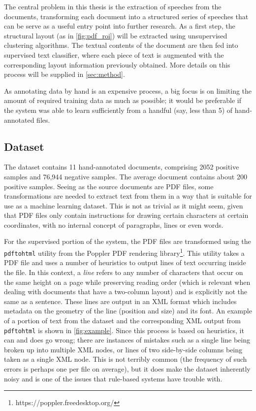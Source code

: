 The central problem in this thesis is the extraction of speeches from the
documents, transforming each document into a structured series of speeches that
can be serve as a useful entry point into further research. As a first step, the
structural layout (as in \cref{fig:pdf_roi}) will be extracted using
unsupervised clustering algorithms. The textual contents of the document are
then fed into supervised text classifier, where each piece of text is augmented
with the corresponding layout information previously obtained. More details on
this process will be supplied in \cref{sec:method}.

As annotating data by hand is an expensive process, a big focus is on limiting
the amount of required training data as much as possible; it would be preferable
if the system was able to learn sufficiently from a handful (say, less than 5)
of hand-annotated files.

\subsection{Dataset}
The dataset contains 11 hand-annotated documents, comprising 2052 positive
samples and 76,944 negative samples. The average document contains about 200
positive samples. Seeing as the source documents are PDF files, some
transformations are needed to extract text from them in a way that is suitable
for use as a machine learning dataset. This is not as trivial as it might seem,
given that PDF files only contain instructions for drawing certain characters at
certain coordinates, with no internal concept of paragraphs, lines or even
words.

For the supervised portion of the system, the PDF files are transformed using
the \texttt{pdftohtml} utility from the Poppler PDF rendering
library\footnote{https://poppler.freedesktop.org/}. This utility takes a PDF
file and uses a number of heuristics to output lines of text occurring
inside the file. In this context, a \emph{line} refers to any number of
characters that occur on the same height on a page while preserving reading
order (which is relevant when dealing with documents that have a two-column
layout) and is explicitly not the same as a sentence. These lines are output in
an XML format which includes metadata on the geometry of the line (position and
size) and its font. An example of a portion of text from the dataset and the
corresponding XML output from \texttt{pdftohtml} is shown in \cref{fig:example}.
Since this process is based on heuristics, it can and does go wrong; there are
instances of mistakes such as a single line being broken up into multiple XML
nodes, or lines of two side-by-side columns being taken as a single XML node.
This is not terribly common (the frequency of such errors is perhaps one per
file on average), but it does make the dataset inherently noisy and is one of
the issues that rule-based systems have trouble with.

